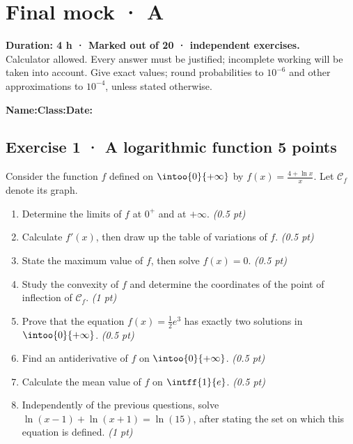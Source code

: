 \fi

\ifmxteacher

\mxnewpage{}\label{sujet:9-3}

\section*{Final mock · A}


\textbf{Duration: 4 h · Marked out of 20 ·  independent exercises.}\\Calculator allowed. Every answer must be justified; incomplete working will be taken into account. Give exact values; round probabilities to $10^{-6}$ and other approximations to $10^{-4}$, unless stated otherwise.

\smallskip\textbf{Name:}\enspace\dotfill\quad\textbf{Class:}\enspace\dotfill\quad\textbf{Date:}\enspace\dotfill

\subsection*{Exercise 1 · A logarithmic function \hfill 5 points}Consider the function $f$ defined on $\intoo{0}{+\infty}$ by $f(x)=\frac{4+\ln x}x$. Let $\mathcal C_f$ denote its graph.

\begin{enumerate}

\item Determine the limits of $f$ at $0^+$ and at $+\infty$. \hfill\textit{(0.5 pt)}

\item Calculate $f' (x)$, then draw up the table of variations of $f$. \hfill\textit{(0.5 pt)}

\item State the maximum value of $f$, then solve $f(x)=0$. \hfill\textit{(0.5 pt)}

\item Study the convexity of $f$ and determine the coordinates of the point of inflection of $\mathcal C_f$. \hfill\textit{(1 pt)}

\item Prove that the equation $f(x)=\frac12 e^{3}$ has exactly two solutions in $\intoo{0}{+\infty}$. \hfill\textit{(0.5 pt)}

\item Find an antiderivative of $f$ on $\intoo{0}{+\infty}$. \hfill\textit{(0.5 pt)}

\item Calculate the mean value of $f$ on $\intff{1}{e}$. \hfill\textit{(0.5 pt)}

\item Independently of the previous questions, solve $\ln(x-1)+\ln(x+1)=\ln(15)$, after stating the set on which this equation is defined. \hfill\textit{(1 pt)}

\end{enumerate}

